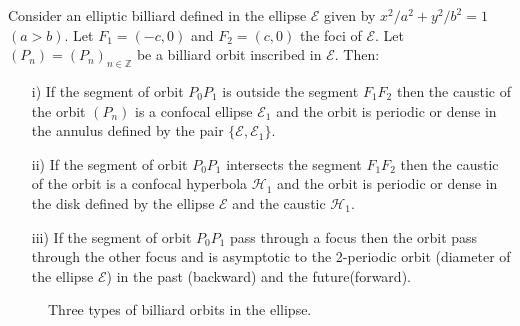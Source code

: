 


 

 \begin{theorem} Consider an  elliptic billiard defined  in the ellipse $\mathcal{E}$ given by $x^2/a^2+y^2/b^2=1$ $(a>b)$. Let $F_1=(-c,0)$ and $F_2=(c,0) $ the foci of $\mathcal{E}$. Let $(P_n)=(P_n)_{n\in\mathbb{Z}}$ be a billiard orbit inscribed in $\mathcal{E}$. Then:
 
 \begin{itemize} 
 \item[i)] If the segment of orbit $P_0P_1$ is outside the segment $F_1F_2$ then the caustic of the orbit $(P_n)$ is a confocal ellipse $\mathcal{E}_1$ and the orbit is periodic or dense in the annulus defined by the pair  $\{\mathcal{E},   \mathcal{E}_1 \}$.
 
  \item[ii)] If the segment of orbit $P_0P_1$   intersects the segment $F_1F_2$ then the caustic of the orbit is a confocal hyperbola  $\mathcal{H}_1$ and the orbit is periodic or dense in the disk defined by the ellipse $\mathcal{E}$ and the caustic $\mathcal{H}_1$.
  
   \item[iii)] If the segment of orbit $P_0P_1$ pass through a focus  then the orbit pass through the other focus and is asymptotic to the 2-periodic orbit (diameter of the ellipse $\mathcal{E}$) in the past (backward) and  the future(forward).
\end{itemize}
 \begin{figure}[H]
	\begin{center}
		\def\svgwidth{1.0\textwidth}
		
		\caption { Three types of billiard orbits in the ellipse.   \label{fig:caustic1}}
	\end{center}
\end{figure}
 \end{theorem}
 
